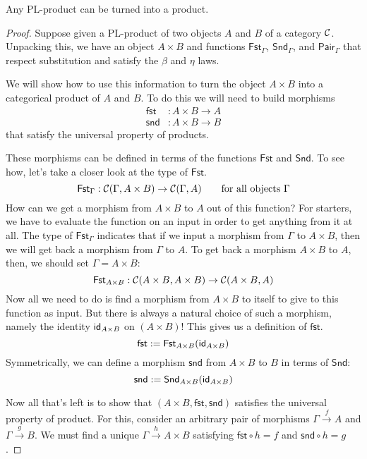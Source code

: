 \begin{construction} \label{cons:pl-prod-to-prod}
  Any PL-product can be turned into a product.
\end{construction}
\begin{proof}
  Suppose given a PL-product of two objects \(A\) and \(B\) of a category \(\mathcal C\).
  Unpacking this, we have an object \(A \times B\)
  and functions \(\mathsf{Fst}_\Gamma\), \(\mathsf{Snd}_\Gamma\), and \(\mathsf{Pair}_\Gamma\)
  that respect substitution and satisfy the \(\beta\) and \(\eta\) laws.

  We will show how to use this information to turn the object \(A \times B\)
  into a categorical product of \(A\) and \(B\).
  To do this we will need to build morphisms
  \begin{align*}
  \mathsf{fst} &: A \times B \to A\\
  \mathsf{snd} &: A \times B \to B
  \end{align*}
  that satisfy the universal property of products.

  These morphisms can be defined in terms of the functions \(\mathsf{Fst}\) and \(\mathsf{Snd}\).
  To see how, let's take a closer look at the type of \(\mathsf{Fst}\).
  \[
    \mathsf{Fst}_\Gamma : \mathcal C(\Gamma, A\times B) \to \mathcal C(\Gamma, A)
    \qquad\text{for all objects \(\Gamma\)}
  \]
  How can we get a morphism from \(A \times B\) to \(A\) out of this function?
  For starters, we have to evaluate the function on an input in order to get anything from it at all.
  The type of \(\mathsf{Fst}_\Gamma\) indicates that if we input a morphism from \(\Gamma\) to \(A \times B\),
  then we will get back a morphism from \(\Gamma\) to \(A\).
  To get back a morphism \(A \times B\) to \(A\), then, we should set \(\Gamma = A \times B\):
  \[
    \mathsf{Fst}_{A\times B}: \mathcal C(A \times B, A\times B) \to \mathcal C(A \times B, A)
  \]
  Now all we need to do is find a morphism from \(A \times B\) to itself to give
  to this function as input. But there is always a natural choice of such a morphism, namely the identity \(\mathsf{id}_{A\times B}\) on \((A \times B)\)!
  This gives us a definition of \(\mathsf{fst}\).
  \[
    \mathsf{fst} := \mathsf{Fst}_{A\times B}(\mathsf{id}_{A\times B})
  \]
  Symmetrically, we can define a morphism \(\mathsf{snd}\) from \(A \times B\) to \(B\)
  in terms of \(\mathsf{Snd}\):
  \[
    \mathsf{snd} := \mathsf{Snd}_{A\times B}(\mathsf{id}_{A\times B})
  \]

  Now all that's left is to show that \((A\times B, \mathsf{fst},\mathsf{snd})\) satisfies the universal property
  of product. For this, consider an arbitrary pair of morphisms \(\Gamma \xrightarrow{f} A\) and \(\Gamma\xrightarrow{g} B\).
  We must find a unique \(\Gamma \xrightarrow{h} A \times B\) satisfying \(\mathsf{fst} \circ h = f\) and \(\mathsf{snd} \circ h = g\).


\end{proof}
